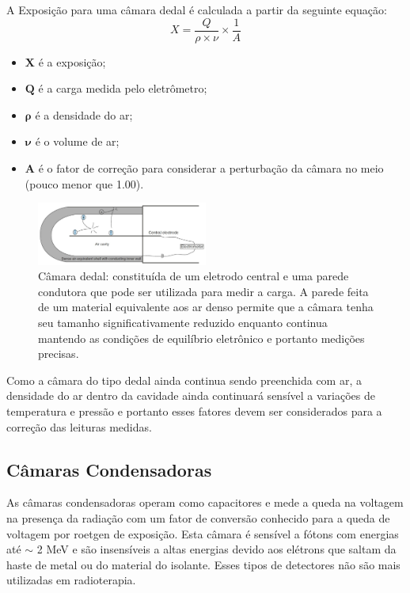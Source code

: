 \documentclass[11pt,a4paper]{article}
\newcounter{exemplo}
\begin{document}
		A Exposição para uma câmara dedal é calculada a partir da seguinte equação:
			\begin{equation}
				X = \frac{Q}{\rho \times \nu} \times \frac{1}{A}
			\end{equation}

		\begin{exemplo}[Onde]
			\begin{itemize}[label=\textcolor{CarnationPink}{$\star$}]
				\item $\mathbf{X}$ é a exposição;
				\item $\mathbf{Q}$ é a carga medida pelo eletrômetro;
				\item $\mathbf{\rho}$ é a densidade do ar;
				\item $\mathbf{\nu}$ é o volume de ar;
				\item $\mathbf{A}$ é o fator de correção para considerar a perturbação da câmara no meio (pouco menor que 1.00).
			\end{itemize}
		\end{exemplo}

		\begin{figure}[h]
			\centering
			\includegraphics[width=0.5\textwidth]{Imagens/camaraDedal.jpg}
			\caption{Câmara dedal: constituída de um eletrodo central e uma parede condutora que pode ser utilizada para medir a carga. A parede feita de um material equivalente aos ar denso permite que a câmara tenha seu tamanho significativamente reduzido enquanto continua mantendo as condições de equilíbrio eletrônico e portanto medições precisas.}
			\label{fig:camaraDedal}
		\end{figure}

		Como a câmara do tipo dedal ainda continua sendo preenchida com ar, a densidade do ar dentro da cavidade ainda continuará sensível a variações de temperatura e pressão e portanto esses fatores devem ser considerados para a correção das leituras medidas.


	\subsection{Câmaras Condensadoras}

		As câmaras condensadoras operam como capacitores e mede a queda na voltagem na presença da radiação com um fator de conversão conhecido para a queda de voltagem por roetgen de exposição. Esta câmara é sensível a fótons com energias até $\sim$ 2 MeV e são insensíveis a altas energias devido aos elétrons que saltam da haste de metal ou do material do isolante. Esses tipos de detectores não são mais utilizadas em radioterapia. 
\end{document}
